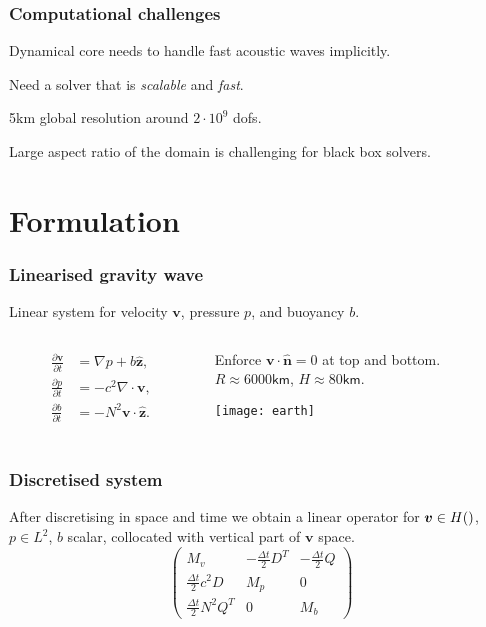 \documentclass[presentation]{beamer}
\renewcommand{\vec}[1]{\ensuremath{\boldsymbol{#1}}}
\newcommand{\ddt}[1]{\frac{\partial #1}{\partial t}}
\newcommand{\zhat}{\hat{\vec{z}}}
\let\div\relax
\DeclareMathOperator{\div}{div}
\begin{document}
\begin{frame}
  \frametitle{Computational challenges}
  Dynamical core needs to handle fast acoustic waves
  implicitly.

  Need a solver that is \emph{scalable} and \emph{fast}.

  5km global resolution around $2 \cdot 10^9$ dofs.

  Large aspect ratio of the domain is challenging for black box
  solvers.
\end{frame}

\section{Formulation}

\begin{frame}
  \frametitle{Linearised gravity wave}
  Linear system for velocity $\vec{v}$, pressure $p$, and buoyancy $b$.
\vspace{2em}

  \begin{columns}
    \begin{column}{0.4\textwidth}
      \begin{align*}
        \ddt{\vec{v}} &= \nabla p + b \zhat, \\
        \ddt{p} &= -c^2 \nabla\cdot \vec{v}, \\
        \ddt{b} &= -N^2\vec{v}\cdot\zhat.\\
      \end{align*}
    \end{column}
    \begin{column}{0.6\textwidth}
      Enforce $\vec{v}\cdot \hat{\vec{n}} = 0$ at top and bottom.\\
      $R\approx 6000\textsf{km}$, $H\approx 80\textsf{km}$. \\
      \begin{center}
        \texttt{[image: earth]}
      \end{center}
    \end{column}
  \end{columns}
\end{frame}

\begin{frame}
  \frametitle{Discretised system}
  After discretising in space and time we obtain a linear operator for
  $\vec{v} \in H(\div)$, $p \in L^2$, $b$ scalar, collocated with
  vertical part of $\vec{v}$ space.
\begin{equation*}
\begin{pmatrix}
  M_v & 
    -\frac{\Delta t}{2}D^T & 
    -\frac{\Delta t}{2}Q\\[1ex]
  \frac{\Delta t}{2}c^2D & M_p & 0\\[1ex]
  \frac{\Delta t}{2}N^2Q^T & 0 & M_b
\end{pmatrix}
\end{equation*}
\end{frame}
\end{document}
